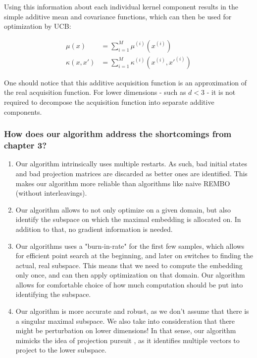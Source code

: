 Using this information about each individual kernel component results in the simple additive mean and covariance functions, which can then be used for optimization by UCB:


\begin{align}
\mu(x) &= \sum_{i=1}^{M} \mu^{(i)} ( x^{(i)} ) \\
\kappa(x, x') &= \sum_{i=1}^{M} \kappa^{(i)} ( x^{(i)}, x'^{(i)}  )
\end{align}

One should notice that this additive acquisition function is an approximation of the real acquisition function. 
For lower dimensions - such as $d<3$ - it is not required to decompose the acquisition function into separate additive components.

\subsubsection{How does our algorithm address the shortcomings from chapter 3?}

\begin{enumerate}
\item Our algorithm intrinsically uses multiple restarts.
As such, bad initial states and bad projection matrices are discarded as better ones are identified.
This makes our algorithm more reliable than algorithms like naive REMBO (without interleavings).
\item Our algorithm allows to not only optimize on a given domain, but also identify the subspace on which the maximal embedding is allocated on.
In addition to that, no gradient information is needed.
\item Our algorithms uses a "burn-in-rate" for the first few samples, which allows for efficient point search at the beginning, and later on switches to finding the actual, real subspace.
This means that we need to compute the embedding only once, and can then apply optimization on that domain.
Our algorithm allows for comfortable choice of how much computation should be put into identifying the subspace.
\item Our algorithm is more accurate and robust, as we don't assume that there is a singular maximal subspace. 
We also take into consideration that there might be perturbation on lower dimensions!
In that sense, our algorithm mimicks the idea of projection pursuit \citep{ProjectionPursuit}, as it identifies multiple vectors to project to the lower subspace.
\end{enumerate}


